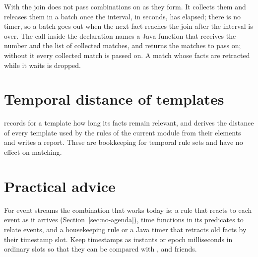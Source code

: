 With  the join does not pass combinations on as they
form. It collects them and releases them in a batch once the interval,
in seconds, has elapsed; there is no timer, so a batch goes out when the
next fact reaches the join after the interval is over. The call inside
the declaration names a Java function that receives the number and the
list of collected matches, and returns the matches to pass on; without
it every collected match is passed on. A match whose facts are retracted
while it waits is dropped.

\section{Temporal distance of templates}

 records for a template how
long its facts remain relevant, and  derives the distance of every template used by the rules of the
current module from their  elements and writes a report.
These are bookkeeping for temporal rule sets and have no effect on
matching.

\section{Practical advice}

For event streams the combination that works today is: a
 rule that reacts to each event as it arrives
(Section~\ref{sec:no-agenda}), time functions in its predicates to
relate events, and a housekeeping rule or a Java timer that retracts old
facts by their timestamp slot. Keep timestamps as instants or epoch
milliseconds in ordinary slots so that they can be compared with
,  and friends.
